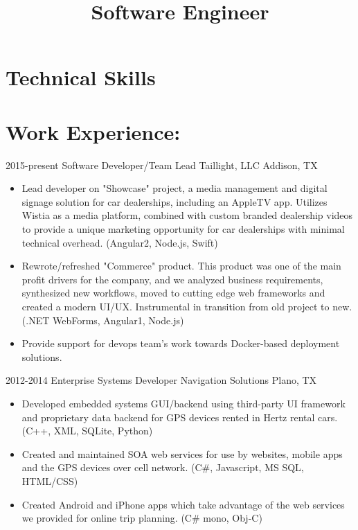 \documentclass{moderncv}
\title{Software Engineer}
\begin{document}
    	
	\makecvtitle
	
	\section{Technical Skills}
	\section{Work Experience:}
	
	\cventry
	{2015-present}
	{Software Developer/Team Lead}   
	{Taillight, LLC}
	{Addison, TX}{}
	{
		\begin{itemize}
			\item {Lead developer on "Showcase" project, a media management and digital signage solution for car dealerships, including an AppleTV app. Utilizes Wistia as a media platform, combined with custom branded dealership videos to provide a unique marketing opportunity for car dealerships with minimal technical overhead.  (Angular2, Node.js, Swift)}
			\item {Rewrote/refreshed "Commerce" product. This product was one of the main profit drivers for the company, and we analyzed business requirements, synthesized new workflows, moved to cutting edge web frameworks and created a modern UI/UX. Instrumental in transition from old project to new. (.NET WebForms, Angular1, Node.js)}
			\item {Provide support for devops team's work towards Docker-based deployment solutions.}
		\end{itemize}
	}
	
	\cventry
	{2012-2014}
	{Enterprise Systems Developer}   
	{Navigation Solutions}
	{Plano, TX}{}
	{
		\begin{itemize}
			\item {Developed embedded systems GUI/backend using third-party UI framework and proprietary data backend for GPS devices rented in Hertz rental cars. (C++, XML, SQLite, Python)}
			\item {Created and maintained SOA web services for use by websites, mobile apps and the GPS devices over cell network. (C\#, Javascript, MS SQL, HTML/CSS)}
			\item {Created Android and iPhone apps which take advantage of the web services we provided for online trip planning. (C\# mono, Obj-C)}
		\end{itemize}
	}
	
\end{document}
